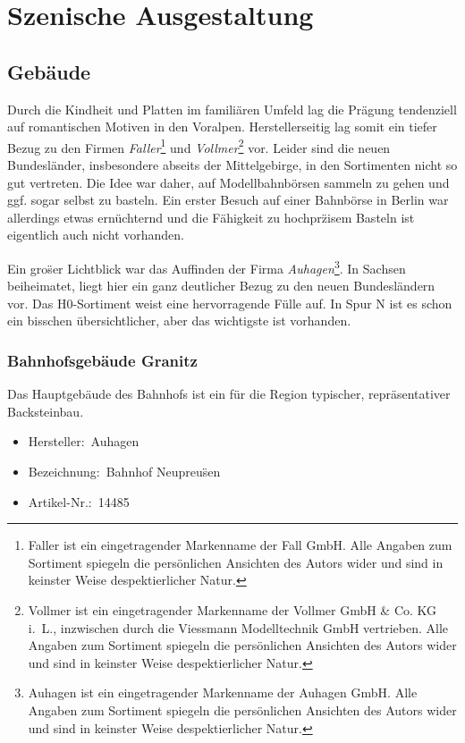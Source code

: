 \section{Szenische Ausgestaltung}
\label{sec:diorama}



\subsection{Geb\"aude}

Durch die Kindheit und Platten im famili\"aren Umfeld lag die Pr\"agung tendenziell auf romantischen Motiven in den Voralpen.
Herstellerseitig lag somit ein tiefer Bezug zu den Firmen
\textit{Faller}\footnote{Faller ist ein eingetragender Markenname der Fall GmbH. Alle Angaben zum Sortiment spiegeln die pers\"onlichen Ansichten des Autors wider und sind in keinster Weise despektierlicher Natur.} und
\textit{Vollmer}\footnote{Vollmer ist ein eingetragender Markenname der Vollmer GmbH \& Co. KG i.~L., inzwischen durch die Viessmann Modelltechnik GmbH vertrieben. Alle Angaben zum Sortiment spiegeln die pers\"onlichen Ansichten des Autors wider und sind in keinster Weise despektierlicher Natur.} vor.
Leider sind die neuen Bundesl\"ander, insbesondere abseits der Mittelgebirge, in den Sortimenten nicht so gut vertreten.
Die Idee war daher, auf Modellbahnb\"orsen sammeln zu gehen und ggf. sogar selbst zu basteln.
Ein erster Besuch auf einer Bahnb\"orse in Berlin war allerdings etwas ern\"uchternd und die F\"ahigkeit zu hochpr\"zisem Basteln ist eigentlich auch nicht vorhanden.

Ein gro\"ser Lichtblick war das Auffinden der Firma
\textit{Auhagen}\footnote{Auhagen ist ein eingetragender Markenname der Auhagen GmbH. Alle Angaben zum Sortiment spiegeln die pers\"onlichen Ansichten des Autors wider und sind in keinster Weise despektierlicher Natur.}.
In Sachsen beiheimatet, liegt hier ein ganz deutlicher Bezug zu den neuen Bundesl\"andern vor.
Das H0-Sortiment weist eine hervorragende F\"ulle auf.
In Spur N ist es schon ein bisschen \"ubersichtlicher, aber das wichtigste ist vorhanden.



\subsubsection{Bahnhofsgeb\"aude Granitz}

Das Hauptgeb\"aude des Bahnhofs ist ein f\"ur die Region typischer, repr\"asentativer Backsteinbau.
\begin{itemize}
	\item[] Hersteller:~Auhagen
	\item[] Bezeichnung:~Bahnhof Neupreu\"sen
	\item[] Artikel-Nr.:~14485
\end{itemize}

